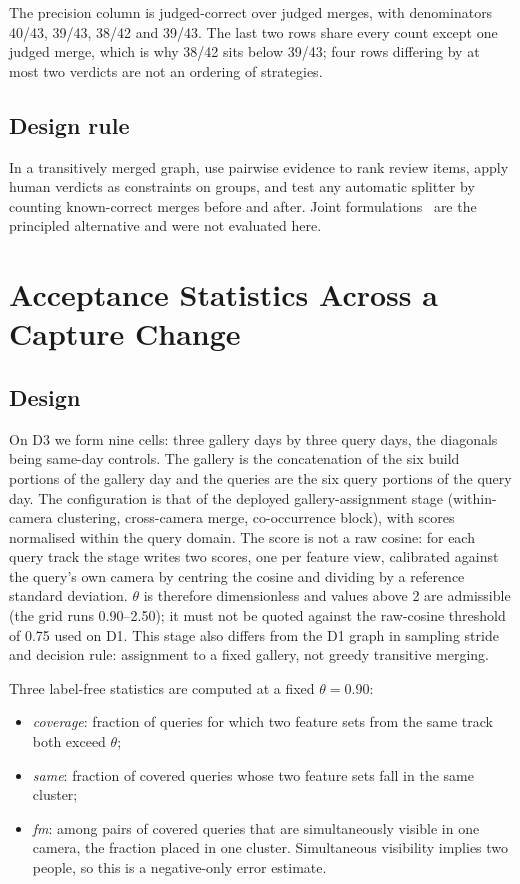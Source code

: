 \documentclass[journal]{IEEEtran}
\begin{document}
The precision column is judged-correct over judged merges, with denominators 40/43, 39/43, 38/42 and 39/43. The last two rows share every count except one judged merge, which is why 38/42 sits below 39/43; four rows differing by at most two verdicts are not an ordering of strategies.

\subsection{Design rule}
In a transitively merged graph, use pairwise evidence to rank review items, apply human verdicts as constraints on groups, and test any automatic splitter by counting known-correct merges before and after. Joint formulations~\cite{bansal2004,tang2017} are the principled alternative and were not evaluated here.

\section{Acceptance Statistics Across a Capture Change}\label{sec:xday}
\subsection{Design}
On D3 we form nine cells: three gallery days by three query days, the diagonals being same-day controls. The gallery is the concatenation of the six build portions of the gallery day and the queries are the six query portions of the query day. The configuration is that of the deployed gallery-assignment stage (within-camera clustering, cross-camera merge, co-occurrence block), with scores normalised within the query domain. The score is not a raw cosine: for each query track the stage writes two scores, one per feature view, calibrated against the query's own camera by centring the cosine and dividing by a reference standard deviation. $\theta$ is therefore dimensionless and values above 2 are admissible (the grid runs 0.90--2.50); it must not be quoted against the raw-cosine threshold of 0.75 used on D1. This stage also differs from the D1 graph in sampling stride and decision rule: assignment to a fixed gallery, not greedy transitive merging.

Three label-free statistics are computed at a fixed $\theta = 0.90$:
\begin{itemize}
\item \emph{coverage}: fraction of queries for which two feature sets from the same track both exceed $\theta$;
\item \emph{same}: fraction of covered queries whose two feature sets fall in the same cluster;
\item \emph{fm}: among pairs of covered queries that are simultaneously visible in one camera, the fraction placed in one cluster. Simultaneous visibility implies two people, so this is a negative-only error estimate.
\end{itemize}
\end{document}
